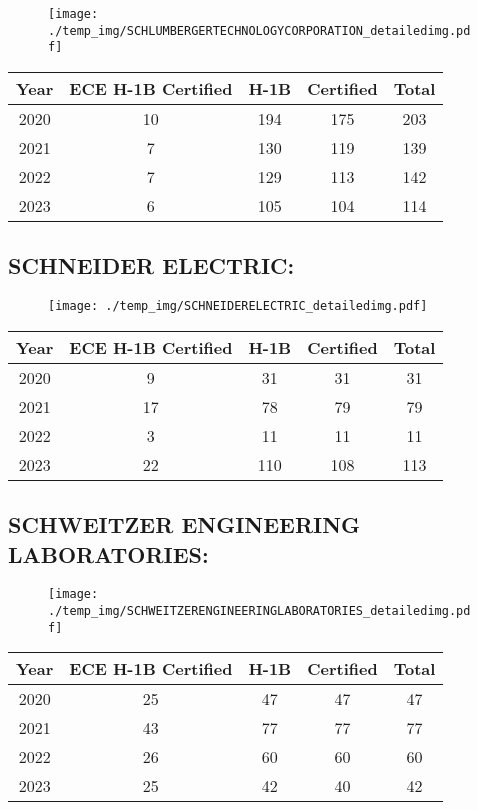 \documentclass{article}%
\begin{document}
\begin{figure}[htbp]%
\centering%
\texttt{[image: ./temp\_img/SCHLUMBERGERTECHNOLOGYCORPORATION\_detailedimg.pdf]}%
\end{figure}

%
\begin{longtable}{c|c|c|c|c}%
\hline%
Year&ECE H{-}1B Certified&H{-}1B&Certified&Total\\%
\hline%
2020&10&194&175&203\\%
\hline%
2021&7&130&119&139\\%
\hline%
2022&7&129&113&142\\%
\hline%
2023&6&105&104&114\\%
\hline%
\end{longtable}

%
\newpage%
\subsection{SCHNEIDER ELECTRIC:}%
\label{subsec:SCHNEIDERELECTRIC}%
\label{SCHNEIDERELECTRICdetailed}%


\begin{figure}[htbp]%
\centering%
\texttt{[image: ./temp\_img/SCHNEIDERELECTRIC\_detailedimg.pdf]}%
\end{figure}

%
\begin{longtable}{c|c|c|c|c}%
\hline%
Year&ECE H{-}1B Certified&H{-}1B&Certified&Total\\%
\hline%
2020&9&31&31&31\\%
\hline%
2021&17&78&79&79\\%
\hline%
2022&3&11&11&11\\%
\hline%
2023&22&110&108&113\\%
\hline%
\end{longtable}

%
\newpage%
\subsection{SCHWEITZER ENGINEERING LABORATORIES:}%
\label{subsec:SCHWEITZERENGINEERINGLABORATORIES}%
\label{SCHWEITZERENGINEERINGLABORATORIESdetailed}%


\begin{figure}[htbp]%
\centering%
\texttt{[image: ./temp\_img/SCHWEITZERENGINEERINGLABORATORIES\_detailedimg.pdf]}%
\end{figure}

%
\begin{longtable}{c|c|c|c|c}%
\hline%
Year&ECE H{-}1B Certified&H{-}1B&Certified&Total\\%
\hline%
2020&25&47&47&47\\%
\hline%
2021&43&77&77&77\\%
\hline%
2022&26&60&60&60\\%
\hline%
2023&25&42&40&42\\%
\hline%
\end{longtable}
\end{document}
